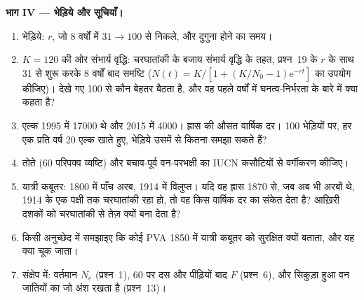 \begin{problem}
\medskip
\noindent\textbf{भाग IV --- भेड़िये और सूचियाँ।}
\begin{enumerate}[resume]
  \item भेड़िये: $r$, जो 8 वर्षों में $31 \to 100$ से निकले, और दुगुना
        होने का समय।
  \item $K = 120$ की ओर संभार्य वृद्धि: चरघातांकी के बजाय संभार्य वृद्धि
        के तहत, प्रश्न~19 के $r$ के साथ 31 से शुरू करके 8 वर्षों बाद
        समष्टि ($N(t) = K/[1 + (K/N_{0} -
        1)\mathrm{e}^{-rt}]$ का उपयोग कीजिए)। देखे गए 100 से कौन बेहतर
        बैठता है, और वह पहले वर्षों में घनत्व-निर्भरता के बारे में क्या
        कहता है?
  \item एल्क 1995 में \num{17000} थे और 2015 में \num{4000}। ह्रास की
        औसत वार्षिक दर। 100 भेड़ियों पर, हर एक प्रति वर्ष \num{20} एल्क
        खाते हुए, भेड़िये उसमें से कितना समझा सकते हैं?
  \item तोते (60 परिपक्व व्यष्टि) और बचाव-पूर्व वन-परभक्षी का IUCN
        कसौटियों से वर्गीकरण कीजिए।
  \item यात्री कबूतर: 1800 में पाँच अरब, 1914 में विलुप्त। यदि वह ह्रास
        1870 से, जब अब भी अरबों थे, 1914 के एक पक्षी तक चरघातांकी रहा
        हो, तो वह किस वार्षिक दर का संकेत देता है?  आख़िरी
        दशकों को चरघातांकी से तेज़ क्यों बना देता है?
  \item किसी अनुच्छेद में समझाइए कि कोई PVA 1850 में यात्री कबूतर को
        सुरक्षित क्यों बताता, और वह क्या चूक जाता।
  \item संक्षेप में: वर्तमान $N_{e}$ (प्रश्न~1), 60 पर दस और पीढ़ियों बाद
        $F$ (प्रश्न~6), और सिकुड़ा हुआ वन जातियों का जो अंश रखता है
        (प्रश्न~13)।
\end{enumerate}
\end{problem}
